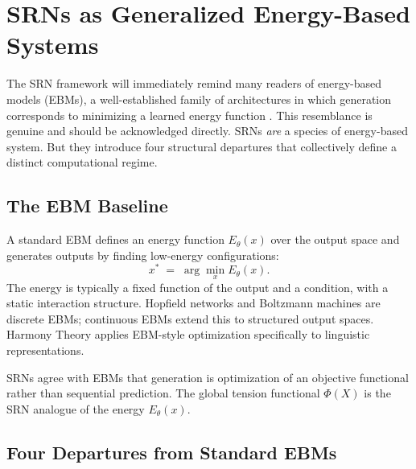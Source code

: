 \documentclass[11pt, a4paper]{article}
\theoremstyle{srn}
\theoremstyle{srnremark}
\newcommand{\Phiten}{\varPhi}            %
\begin{document}
\section{SRNs as Generalized Energy-Based Systems}
\label{sec:ebm}

The SRN framework will immediately remind many readers of
energy-based models (EBMs), a well-established family of
architectures in which generation corresponds to minimizing a learned
energy function \citep{lecun2006ebm, hopfield1982neural,
ackley1985boltzmann}.
This resemblance is genuine and should be acknowledged directly.
SRNs \emph{are} a species of energy-based system.
But they introduce four structural departures that collectively define
a distinct computational regime.

\subsection{The EBM Baseline}

A standard EBM defines an energy function $E_\theta(x)$ over the
output space and generates outputs by finding low-energy
configurations:
\[
  x^* \;=\; \arg\min_{x} E_\theta(x).
\]
The energy is typically a fixed function of the output and a condition,
with a static interaction structure.
Hopfield networks \citep{hopfield1982neural} and Boltzmann machines
\citep{ackley1985boltzmann} are discrete EBMs; continuous EBMs
\citep{lecun2006ebm} extend this to structured output spaces.
Harmony Theory \citep{smolensky1986harmony} applies EBM-style
optimization specifically to linguistic representations.

SRNs agree with EBMs that generation is optimization of an objective
functional rather than sequential prediction.
The global tension functional $\Phiten(X)$ is the SRN analogue of the
energy $E_\theta(x)$.

\subsection{Four Departures from Standard EBMs}
\end{document}
